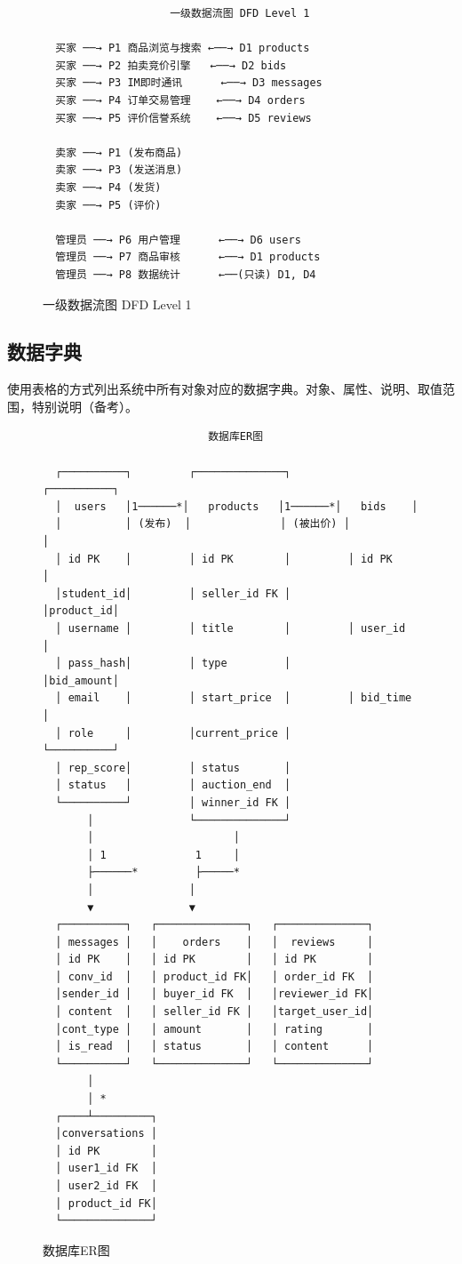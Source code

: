 \documentclass[12pt,a4paper]{ctexart}
\numberwithin{figure}{section}
\numberwithin{table}{section}
\begin{document}
\begin{figure}[H]
\centering
{\small
\begin{verbatim}
                    一级数据流图 DFD Level 1

  买家 ──→ P1 商品浏览与搜索 ←──→ D1 products
  买家 ──→ P2 拍卖竞价引擎   ←──→ D2 bids
  买家 ──→ P3 IM即时通讯      ←──→ D3 messages
  买家 ──→ P4 订单交易管理    ←──→ D4 orders
  买家 ──→ P5 评价信誉系统    ←──→ D5 reviews

  卖家 ──→ P1 (发布商品)
  卖家 ──→ P3 (发送消息)
  卖家 ──→ P4 (发货)
  卖家 ──→ P5 (评价)

  管理员 ──→ P6 用户管理      ←──→ D6 users
  管理员 ──→ P7 商品审核      ←──→ D1 products
  管理员 ──→ P8 数据统计      ←──(只读) D1, D4
\end{verbatim}
}
\caption{一级数据流图 DFD Level 1}
\label{fig:dfd1}
\end{figure}

\subsection{数据字典}

使用表格的方式列出系统中所有对象对应的数据字典。对象、属性、说明、取值范围，特别说明（备考）。

\begin{figure}[H]
\centering
{\small
\begin{verbatim}
                          数据库ER图

  ┌──────────┐         ┌──────────────┐         ┌──────────┐
  │  users   │1──────*│   products   │1──────*│   bids    │
  │          │ (发布)  │              │ (被出价) │          │
  │ id PK    │         │ id PK        │         │ id PK    │
  │student_id│         │ seller_id FK │         │product_id│
  │ username │         │ title        │         │ user_id  │
  │ pass_hash│         │ type         │         │bid_amount│
  │ email    │         │ start_price  │         │ bid_time │
  │ role     │         │current_price │         └──────────┘
  │ rep_score│         │ status       │
  │ status   │         │ auction_end  │
  └──────────┘         │ winner_id FK │
       │               └──────────────┘
       │                      │
       │ 1              1     │
       ├──────*         ├─────*
       │               │
       ▼               ▼
  ┌──────────┐   ┌──────────────┐   ┌──────────────┐
  │ messages │   │    orders    │   │  reviews     │
  │ id PK    │   │ id PK        │   │ id PK        │
  │ conv_id  │   │ product_id FK│   │ order_id FK  │
  │sender_id │   │ buyer_id FK  │   │reviewer_id FK│
  │ content  │   │ seller_id FK │   │target_user_id│
  │cont_type │   │ amount       │   │ rating       │
  │ is_read  │   │ status       │   │ content      │
  └──────────┘   └──────────────┘   └──────────────┘
       │
       │ *
  ┌────┴─────────┐
  │conversations │
  │ id PK        │
  │ user1_id FK  │
  │ user2_id FK  │
  │ product_id FK│
  └──────────────┘
\end{verbatim}
}
\caption{数据库ER图}
\label{fig:er}
\end{figure}
\end{document}
